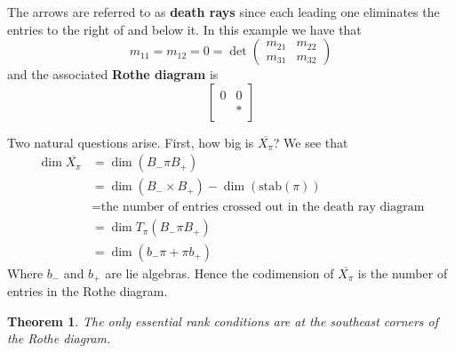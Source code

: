 \documentclass[12pt]{amsart}
\numberwithin{equation}{section}
\newtheorem{Theorem}[equation]{Theorem}
\theoremstyle{definition}
\numberwithin{figure}{section}
\begin{document}
\begin{center}
\end{center}
The arrows are referred to as \textbf{death rays} since each leading one eliminates the entries to the right of and below it. In this example we have that $$m_{11}=m_{12}=0=\det\left ( \begin{array}{cc} m_{21} & m_{22} \\ m_{31} & m_{32}  \end{array}\right )$$ and the associated \textbf{Rothe diagram} is $$\left [ \begin{array}{cc} 0 & 0 \\ & *\end{array}\right ]$$

Two natural questions arise. First, how big is $\overline{X_\pi}$? We see that \begin{align*}
	\dim\overline{X_\pi}&=\dim(B_-\pi B_+) \\
	&= \dim(B_-\times B_+)-\dim(\text{stab}(\pi))\\
	&=\text{the number of entries crossed out in the death ray diagram}\\
	&=\dim T_\pi(B_-\pi B_+)\\
	&=\dim(b_-\pi+\pi b_+)
\end{align*}
Where $b_-$ and $b_+$ are lie algebras. Hence the codimension of $\overline{X_\pi}$ is the number of entries in the Rothe diagram.

\begin{Theorem}
	The only essential rank conditions are at the southeast corners of the Rothe diagram.
\end{Theorem}
\end{document}
